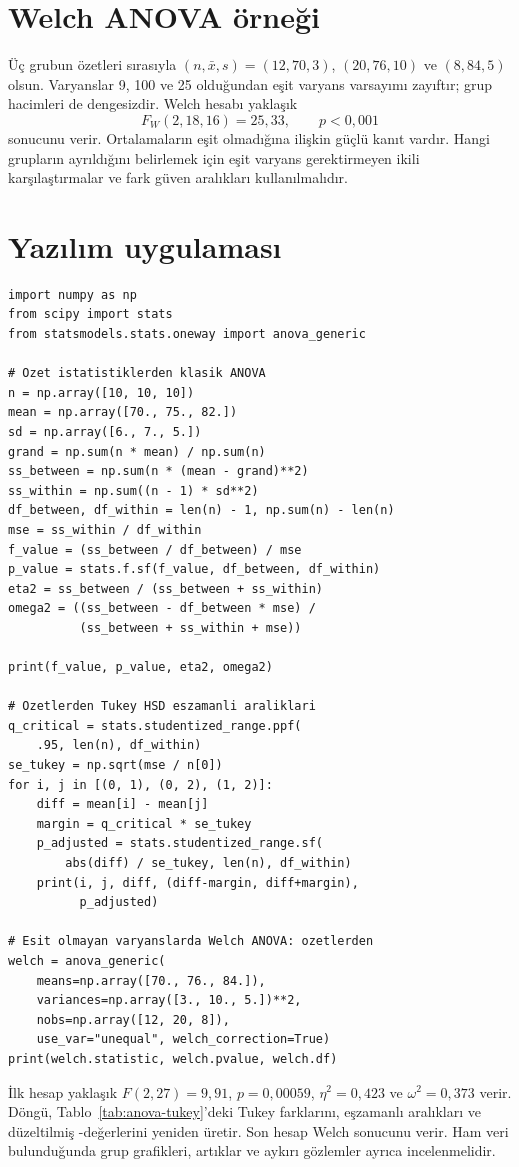 \section{Welch ANOVA örneği}

Üç grubun özetleri sırasıyla $(n,\bar x,s)=(12,70,3)$,
$(20,76,10)$ ve $(8,84,5)$ olsun. Varyanslar 9, 100 ve 25 olduğundan eşit
varyans varsayımı zayıftır; grup hacimleri de dengesizdir. Welch hesabı
yaklaşık
\[
F_W(2,18{,}16)=25{,}33,\qquad p<0{,}001
\]
sonucunu verir. Ortalamaların eşit olmadığına ilişkin güçlü kanıt vardır.
Hangi grupların ayrıldığını belirlemek için eşit varyans gerektirmeyen ikili
karşılaştırmalar ve fark güven aralıkları kullanılmalıdır.

\section{Yazılım uygulaması}

\begin{softwarebox}
\begin{lstlisting}
import numpy as np
from scipy import stats
from statsmodels.stats.oneway import anova_generic

# Ozet istatistiklerden klasik ANOVA
n = np.array([10, 10, 10])
mean = np.array([70., 75., 82.])
sd = np.array([6., 7., 5.])
grand = np.sum(n * mean) / np.sum(n)
ss_between = np.sum(n * (mean - grand)**2)
ss_within = np.sum((n - 1) * sd**2)
df_between, df_within = len(n) - 1, np.sum(n) - len(n)
mse = ss_within / df_within
f_value = (ss_between / df_between) / mse
p_value = stats.f.sf(f_value, df_between, df_within)
eta2 = ss_between / (ss_between + ss_within)
omega2 = ((ss_between - df_between * mse) /
          (ss_between + ss_within + mse))

print(f_value, p_value, eta2, omega2)

# Ozetlerden Tukey HSD eszamanli araliklari
q_critical = stats.studentized_range.ppf(
    .95, len(n), df_within)
se_tukey = np.sqrt(mse / n[0])
for i, j in [(0, 1), (0, 2), (1, 2)]:
    diff = mean[i] - mean[j]
    margin = q_critical * se_tukey
    p_adjusted = stats.studentized_range.sf(
        abs(diff) / se_tukey, len(n), df_within)
    print(i, j, diff, (diff-margin, diff+margin),
          p_adjusted)

# Esit olmayan varyanslarda Welch ANOVA: ozetlerden
welch = anova_generic(
    means=np.array([70., 76., 84.]),
    variances=np.array([3., 10., 5.])**2,
    nobs=np.array([12, 20, 8]),
    use_var="unequal", welch_correction=True)
print(welch.statistic, welch.pvalue, welch.df)
\end{lstlisting}
İlk hesap yaklaşık $F(2,27)=9{,}91$, $p=0{,}00059$,
$\eta^2=0{,}423$ ve $\omega^2=0{,}373$ verir. Döngü,
Tablo~\ref{tab:anova-tukey}'deki Tukey farklarını, eşzamanlı aralıkları ve
düzeltilmiş \pval-değerlerini yeniden üretir. Son hesap Welch sonucunu verir.
Ham veri bulunduğunda grup grafikleri, artıklar ve aykırı gözlemler ayrıca
incelenmelidir.
\end{softwarebox}

